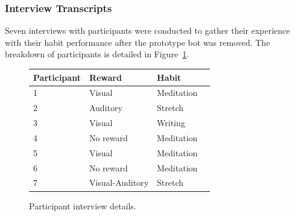 \subsubsection{Interview Transcripts}
Seven interviews with participants were conducted to gather their experience with their habit performance after the prototype bot was removed. The breakdown of participants is detailed in Figure~\ref{fig:interview_details}.

\begin{figure}[H] %
\begin{center}
\begin{tabular}{ |p{3cm}|p{2.8cm}|p{3cm}|p{2cm}| }
 \hline
 \textbf{Participant} & \textbf{Reward} & \textbf{Habit} \\ \hline
 1 & Visual & Meditation \\ \hline
 2 & Auditory & Stretch \\ \hline
 3 & Visual & Writing \\ \hline
 4 & No reward & Meditation \\ \hline
 5 & Visual & Meditation \\ \hline
 6 & No reward & Meditation \\ \hline
 7 & Visual-Auditory & Stretch \\ \hline
\end{tabular}
\end{center}
    \caption{Participant interview details.}
    \label{fig:interview_details}

\end{figure}


